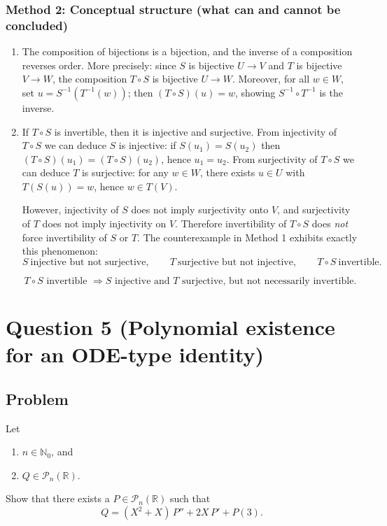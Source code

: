 \documentclass[12pt]{article}
\newcommand{\R}{\mathbb{R}}
\newcommand{\cPn}{\mathcal{P}_n}
\begin{document}
\subsubsection{Method 2: Conceptual structure (what can and cannot be concluded)}
\begin{enumerate}[label=(\alph*)]
\item The composition of bijections is a bijection, and the inverse of a composition reverses order.
More precisely: since $S$ is bijective $U\to V$ and $T$ is bijective $V\to W$, the composition $T\circ S$ is bijective $U\to W$.
Moreover, for all $w\in W$, set $u=S^{-1}(T^{-1}(w))$; then $(T\circ S)(u)=w$, showing $S^{-1}\circ T^{-1}$ is the inverse.

\item If $T\circ S$ is invertible, then it is injective and surjective. From injectivity of $T\circ S$ we can deduce $S$ is injective:
if $S(u_1)=S(u_2)$ then $(T\circ S)(u_1)=(T\circ S)(u_2)$, hence $u_1=u_2$.
From surjectivity of $T\circ S$ we can deduce $T$ is surjective:
for any $w\in W$, there exists $u\in U$ with $T(S(u))=w$, hence $w\in T(V)$.

However, injectivity of $S$ does not imply surjectivity onto $V$, and surjectivity of $T$ does not imply injectivity on $V$.
Therefore invertibility of $T\circ S$ does \emph{not} force invertibility of $S$ or $T$.
The counterexample in Method 1 exhibits exactly this phenomenon:
\[
S\ \text{injective but not surjective},\qquad
T\ \text{surjective but not injective},\qquad
T\circ S\ \text{invertible}.
\]

\[
\boxed{\,T\circ S\text{ invertible }\Rightarrow S\text{ injective and }T\text{ surjective, but not necessarily invertible.}\,}
\]
\end{enumerate}

\newpage
\section{Question 5 (Polynomial existence for an ODE-type identity)}
\subsection{Problem}
Let
\begin{enumerate}[label=(\roman*)]
\item $n\in\mathbb{N}_0$, and
\item $Q\in \cPn(\R)$.
\end{enumerate}
Show that there exists a $P\in \cPn(\R)$ such that
\[
Q=(X^2+X)\,P''+2X\,P'+P(3).
\]
\end{document}
